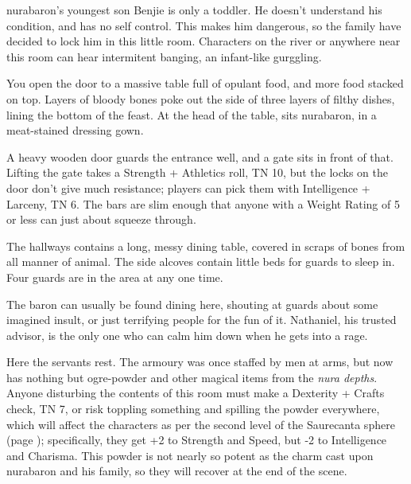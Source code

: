\begin{multicols}{2}
\Gls{nurabaron}'s youngest son Benjie is only a toddler.  He doesn't understand his condition, and has no self control.  This makes him dangerous, so the family have decided to lock him in this little room.  Characters on the river or anywhere near this room can hear intermitent banging, an infant-like gurggling.


\deephobgoblin


\begin{boxtext}

	You open the door to a massive table full of opulant food, and more food stacked on top.  Layers of bloody bones poke out the side of three layers of filthy dishes, lining the bottom of the feast.  At the head of the table, sits \gls{nurabaron}, in a meat-stained dressing gown.

\end{boxtext}

A heavy wooden door guards the entrance well, and a gate sits in front of that.  Lifting the gate takes a Strength + Athletics roll, TN 10, but the locks on the door don't give much resistance; players can pick them with Intelligence + Larceny, TN 6.  The bars are slim enough that anyone with a Weight Rating of 5 or less can just about squeeze through.

The hallways contains a long, messy dining table, covered in scraps of bones from all manner of animal.  The side alcoves contain little beds for guards to sleep in.  Four guards are in the area at any one time.

The baron can usually be found dining here, shouting at guards about some imagined insult, or just terrifying people for the fun of it.  Nathaniel, his trusted advisor, is the only one who can calm him down when he gets into a rage.




Here the servants rest.  The armoury was once staffed by men at arms, but now has nothing but ogre-powder and other magical items from the \textit{nura depths}.  Anyone disturbing the contents of this room must make a Dexterity + Crafts check, TN 7, or risk toppling something and spilling the powder everywhere, which will affect the characters as per the second level of the Saurecanta sphere (page \pageref{saurecanta}); specifically, they get +2 to Strength and Speed, but -2 to Intelligence and Charisma.  This powder is not nearly so potent as the charm cast upon \gls{nurabaron} and his family, so they will recover at the end of the scene.


\end{multicols}
